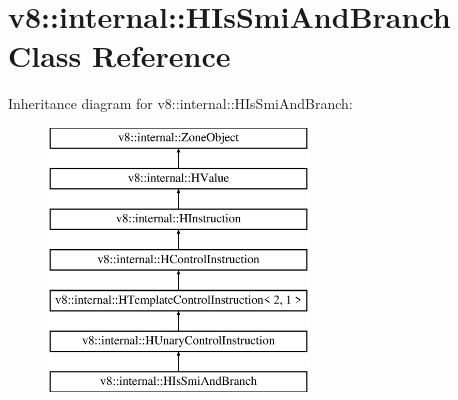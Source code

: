 \hypertarget{classv8_1_1internal_1_1_h_is_smi_and_branch}{}\section{v8\+:\+:internal\+:\+:H\+Is\+Smi\+And\+Branch Class Reference}
\label{classv8_1_1internal_1_1_h_is_smi_and_branch}
Inheritance diagram for v8\+:\+:internal\+:\+:H\+Is\+Smi\+And\+Branch\+:\begin{figure}[H]
\begin{center}
\leavevmode
\includegraphics[height=7.000000cm]{classv8_1_1internal_1_1_h_is_smi_and_branch}
\end{center}
\end{figure}
